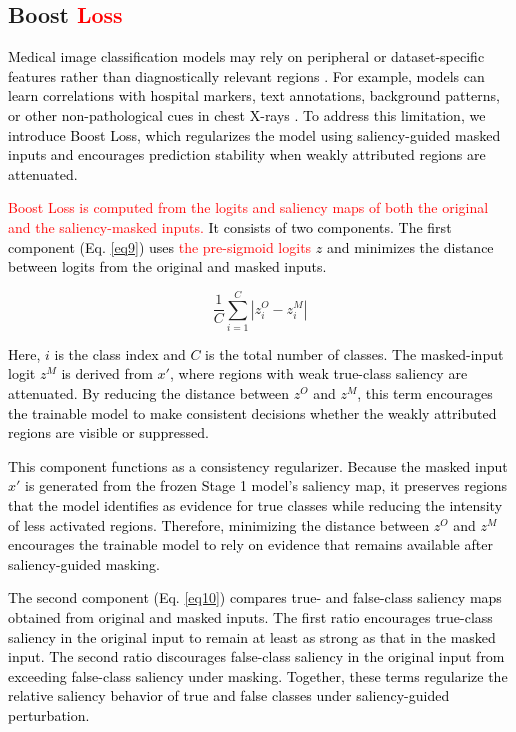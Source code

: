 \documentclass[preprint,7pt, a4paper]{elsarticle}
\begin{document}
\subsection{Boost \textcolor{red}{Loss}}
\label{m4}

\textcolor{black}{Medical image classification models may rely on peripheral or dataset-specific features rather than diagnostically relevant regions \cite{45, 46}. For example, models can learn correlations with hospital markers, text annotations, background patterns, or other non-pathological cues in chest X-rays \cite{47,15}. To address this limitation, we introduce Boost Loss, which regularizes the model using saliency-guided masked inputs and encourages prediction stability when weakly attributed regions are attenuated.}

\textcolor{black}{\textcolor{red}{Boost Loss is computed from the logits and saliency maps of both the original and the saliency-masked inputs.} It consists of two components. The first component (Eq. \ref{eq9}) uses \textcolor{red}{the pre-sigmoid logits} $z$ and minimizes the distance between logits from the original and masked inputs.}


\begin{equation}
    \frac{1}{C} \sum_{i=1}^C |z^O_i - z^M_i| 
    \label{eq9}
\end{equation}

\textcolor{black}{Here, $i$ is the class index and $C$ is the total number of classes. The masked-input logit $z^M$ is derived from $x'$, where regions with weak true-class saliency are attenuated. By reducing the distance between $z^O$ and $z^M$, this term encourages the trainable model to make consistent decisions whether the weakly attributed regions are visible or suppressed.}

\textcolor{black}{This component functions as a consistency regularizer. Because the masked input $x'$ is generated from the frozen Stage 1 model's saliency map, it preserves regions that the model identifies as evidence for true classes while reducing the intensity of less activated regions. Therefore, minimizing the distance between $z^O$ and $z^M$ encourages the trainable model to rely on evidence that remains available after saliency-guided masking.}

\textcolor{black}{The second component (Eq. \ref{eq10}) compares true- and false-class saliency maps obtained from original and masked inputs. The first ratio encourages true-class saliency in the original input to remain at least as strong as that in the masked input. The second ratio discourages false-class saliency in the original input from exceeding false-class saliency under masking. Together, these terms regularize the relative saliency behavior of true and false classes under saliency-guided perturbation.}
\end{document}
